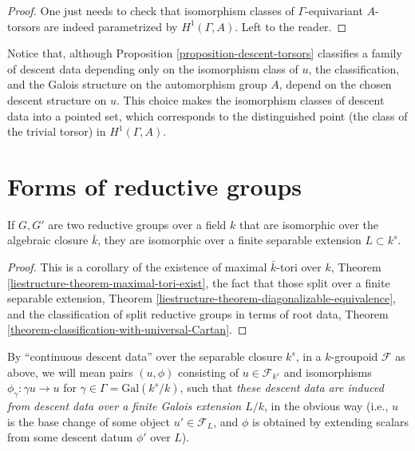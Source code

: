 \begin{proof}
 One just needs to check that isomorphism classes of $\Gamma$-equivariant $A$-torsors are indeed parametrized by $H^1(\Gamma, A)$. Left to the reader.
\end{proof}



\begin{remark}
 \label{remark-torsors-base-point}
Notice that, although Proposition \ref{proposition-descent-torsors} classifies a family of descent data depending only on the isomorphism class of $u$, the classification, and the Galois structure on the automorphism group $A$, depend on the chosen descent structure on $u$. This choice makes the isomorphism classes of descent data into a pointed set, which corresponds to the distinguished point (the class of the trivial torsor) in $H^1(\Gamma, A)$.
\end{remark}




\section{Forms of reductive groups}


\begin{lemma}
 \label{lemma-reductive-isomorphic-separable}
If $G, G'$ are two reductive groups over a field $k$ that are isomorphic over the algebraic closure $\bar k$, they are isomorphic over a finite separable extension $L\subset k^s$.
\end{lemma}

\begin{proof}
 This is a corollary of the existence of maximal $\bar k$-tori over $k$, Theorem \ref{liestructure-theorem-maximal-tori-exist}, the fact that those split over a finite separable extension, Theorem \ref{liestructure-theorem-diagonalizable-equivalence}, and the classification of split reductive groups in terms of root data, Theorem \ref{theorem-classification-with-universal-Cartan}.
\end{proof}

By ``continuous descent data'' over the separable closure $k^s$, in a $k$-groupoid $\mathcal F$ as above, we will mean pairs $(u,\phi)$ consisting of $u\in \mathcal F_{k^s}$ and isomorphisms $\phi_\gamma: \gamma u \to u$ for $\gamma\in\Gamma = \text{Gal}(k^s/k)$, such that \emph{these descent data are induced from descent data over a finite Galois extension $L/k$}, in the obvious way (i.e., $u$ is the base change of some object $u'\in \mathcal F_L$, and $\phi$ is obtained by extending scalars from some descent datum $\phi'$ over $L$).


